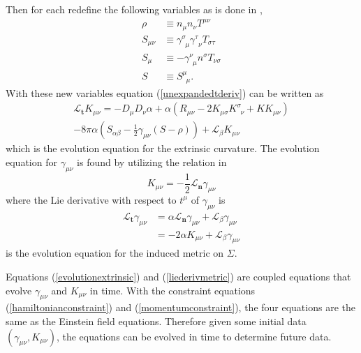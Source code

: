 \documentclass[11pt]{article}
\newcommand{\blank}{\enspace}
\numberwithin{equation}{section}
\begin{document}
Then for each redefine the following variables as is done in \cite{baumgarte_shapiro_2010} ,
\begin{align}
    \rho &\equiv n_{\mu}n_{\nu}T^{\mu\nu} \label{contractstressenergy} \\ 
    S_{\mu\nu} &\equiv \gamma^{\sigma}_{\blank\mu}\gamma^{\tau}_{\blank\nu}T_{\sigma\tau} \label{Smunu}\\
    S_{\mu} &\equiv -\gamma^{\nu}_{\blank\mu}n^{\sigma}T_{\nu\sigma} \label{Smu} \\
    S &\equiv S^{\mu}_{\blank\mu} \label{constractS}.
\end{align}
With these new variables equation (\ref{unexpandedtderiv}) can be written as
\begin{equation}
\begin{split} \label{evolutionextrinsic}
    \mathcal{L_{\textbf{t}}}K_{\mu\nu} = -D_{\mu}D_{\nu}\alpha + \alpha(R_{\mu\nu} - 2K_{\mu\sigma}K^{\sigma}_{\blank\nu} + KK_{\mu\nu}) \\- 8\pi\alpha(S_{\alpha\beta} - \frac12\gamma_{\mu\nu}(S - \rho)) + \mathcal{L_{\beta}}K_{\mu\nu}
\end{split}
\end{equation}
which is the evolution equation for the extrinsic curvature. The evolution equation for $\gamma_{\mu\nu}$ is found by utilizing the relation in \cite{baumgarte_shapiro_2010} 
\begin{equation}\label{liederivextrinsic}
K_{\mu\nu} = -\frac12\mathcal{L_{\textbf{n}}}\gamma_{\mu\nu}
\end{equation}
where the Lie derivative with respect to $t^{\mu}$ of $\gamma_{\mu\nu}$ is
\begin{equation}
\begin{split}
\mathcal{L_{\textbf{t}}}\gamma_{\mu\nu} &= \alpha\mathcal{L_{\textbf{n}}}\gamma_{\mu\nu} + \mathcal{L_{\beta}}\gamma_{\mu\nu} \\ &= -2\alpha K_{\mu\nu} + \mathcal{L_{\beta}}\gamma_{\mu\nu} \label{liederivmetric}
\end{split}
\end{equation}
is the evolution equation for the induced metric on $\Sigma$. 

Equations (\ref{evolutionextrinsic}) and (\ref{liederivmetric}) are coupled equations that evolve $\gamma_{\mu\nu}$ and $K_{\mu\nu}$ in time. With the constraint equations (\ref{hamiltonianconstraint}) and (\ref{momentumconstraint}), the four equations are the same as the Einstein field equations. Therefore given some initial data $(\gamma_{\mu\nu}, K_{\mu\nu})$, the equations can be evolved in time to determine future data. 
\end{document}
